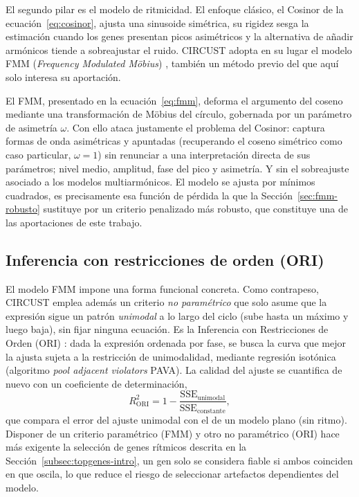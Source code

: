 \documentclass[12pt, a4paper]{report}
\begin{document}
El segundo pilar es el modelo de ritmicidad. El enfoque clásico, el Cosinor \cite{cosinor} de la ecuación~\eqref{eq:cosinor}, ajusta una sinusoide simétrica, su rigidez sesga la estimación cuando los genes presentan picos asimétricos y la alternativa de añadir armónicos tiende a sobreajustar el ruido. CIRCUST adopta en su lugar el modelo FMM (\textit{Frequency Modulated Möbius}) \cite{fmmAlgorithm}, también un método previo del que aquí solo interesa su aportación.

El FMM, presentado en la ecuación~\eqref{eq:fmm}, deforma el argumento del coseno mediante una transformación de Möbius del círculo, gobernada por un parámetro de asimetría $\omega$. Con ello ataca justamente el problema del Cosinor: captura formas de onda asimétricas y apuntadas (recuperando el coseno simétrico como caso particular, $\omega=1$) sin renunciar a una interpretación directa de sus parámetros; nivel medio, amplitud, fase del pico y asimetría. Y sin el sobreajuste asociado a los modelos multiarmónicos. El modelo se ajusta por mínimos cuadrados, es precisamente esa función de pérdida la que la Sección~\ref{sec:fmm-robusto} sustituye por un criterio penalizado más robusto, que constituye una de las aportaciones de este trabajo.

\subsection{Inferencia con restricciones de orden (ORI)}
\label{subsec:ori-formal}

El modelo FMM impone una forma funcional concreta. Como contrapeso, CIRCUST emplea además un criterio \emph{no paramétrico} que solo asume que la expresión sigue un patrón \emph{unimodal} a lo largo del ciclo (sube hasta un máximo y luego baja), sin fijar ninguna ecuación. Es la Inferencia con Restricciones de Orden (ORI) \cite{larribaORI}: dada la expresión ordenada por fase, se busca la curva que mejor la ajusta sujeta a la restricción de unimodalidad, mediante regresión isotónica (algoritmo \textit{pool adjacent violators} PAVA). La calidad del ajuste se cuantifica de nuevo con un coeficiente de determinación,
\begin{equation}
    R^2_{\text{ORI}} = 1 - \frac{\text{SSE}_{\text{unimodal}}}{\text{SSE}_{\text{constante}}},
    \label{eq:r2-ori}
\end{equation}
que compara el error del ajuste unimodal con el de un modelo plano (sin ritmo). Disponer de un criterio paramétrico (FMM) y otro no paramétrico (ORI) hace más exigente la selección de genes rítmicos descrita en la Sección~\ref{subsec:topgenes-intro}, un gen solo se considera fiable si ambos coinciden en que oscila, lo que reduce el riesgo de seleccionar artefactos dependientes del modelo.
\end{document}
